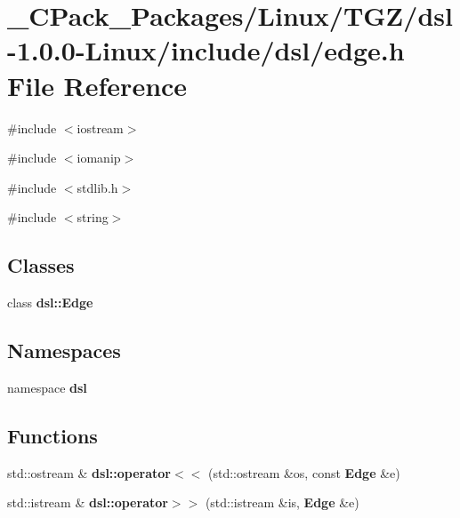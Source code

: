 \section{\_\-CPack\_\-Packages/Linux/TGZ/dsl-\/1.0.0-\/Linux/include/dsl/edge.h File Reference}
\label{__CPack__Packages_2Linux_2TGZ_2dsl-1_80_80-Linux_2include_2dsl_2edge_8h}
{\ttfamily \#include $<$iostream$>$}\par
{\ttfamily \#include $<$iomanip$>$}\par
{\ttfamily \#include $<$stdlib.h$>$}\par
{\ttfamily \#include $<$string$>$}\par
\subsection*{Classes}
\begin{DoxyCompactItemize}
\item 
class {\bf dsl::Edge}
\end{DoxyCompactItemize}
\subsection*{Namespaces}
\begin{DoxyCompactItemize}
\item 
namespace {\bf dsl}
\end{DoxyCompactItemize}
\subsection*{Functions}
\begin{DoxyCompactItemize}
\item 
std::ostream \& {\bf dsl::operator$<$$<$} (std::ostream \&os, const {\bf Edge} \&e)
\item 
std::istream \& {\bf dsl::operator$>$$>$} (std::istream \&is, {\bf Edge} \&e)
\end{DoxyCompactItemize}
